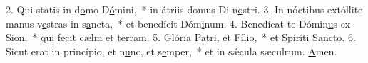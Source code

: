 2. Qui statis in d\uline{o}mo D\uline{ó}mini,~* in átriis domus Di n\uline{o}stri.
3. In nóctibus extóllite manus v\uline{e}stras in s\uline{a}ncta,~* et benedícit Dóm\uline{i}num.
4. Benedícat te Dómin\uline{u}s ex S\uline{i}on,~* qui fecit cælm et t\uline{e}rram.
5. Glória P\uline{a}tri, et F\uline{í}lio,~* et Spiríti S\uline{a}ncto.
6. Sicut erat in princípio, et n\uline{u}nc, et s\uline{e}mper,~* et in sǽcula sæculrum. \uline{A}men.
